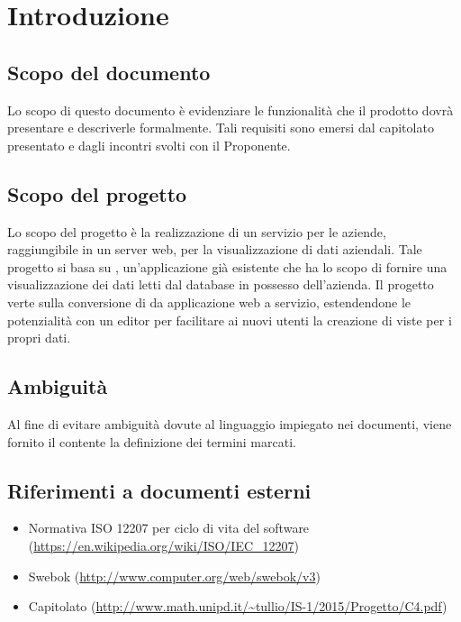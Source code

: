 \section{Introduzione}
\subsection{Scopo del documento}
Lo scopo di questo documento è evidenziare le funzionalit\`a che il prodotto dovr\`a presentare e descriverle formalmente. Tali requisiti sono emersi dal capitolato presentato e dagli incontri svolti con il Proponente.

\subsection{Scopo del progetto}
Lo scopo del progetto è la realizzazione di un servizio per le aziende, raggiungibile in un server web, per la visualizzazione di dati aziendali. Tale progetto si basa su , un'applicazione già esistente che ha lo scopo di fornire una visualizzazione dei dati letti dal database  in possesso dell'azienda. Il progetto verte sulla conversione di  da applicazione web a servizio, estendendone le potenzialità con un editor per facilitare ai nuovi utenti la creazione di viste per i propri dati.

\subsection{Ambiguit\`a} 
Al fine di evitare ambiguità dovute al linguaggio impiegato nei documenti, viene fornito il \Glossario contente la definizione dei termini marcati.

\subsection{Riferimenti a documenti esterni}
\begin{itemize}
\item Normativa ISO 12207 per ciclo di vita del software (\url{https://en.wikipedia.org/wiki/ISO/IEC_12207})
\item Swebok (\url{http://www.computer.org/web/swebok/v3})
\item Capitolato (\url{http://www.math.unipd.it/~tullio/IS-1/2015/Progetto/C4.pdf})
\end{itemize}


